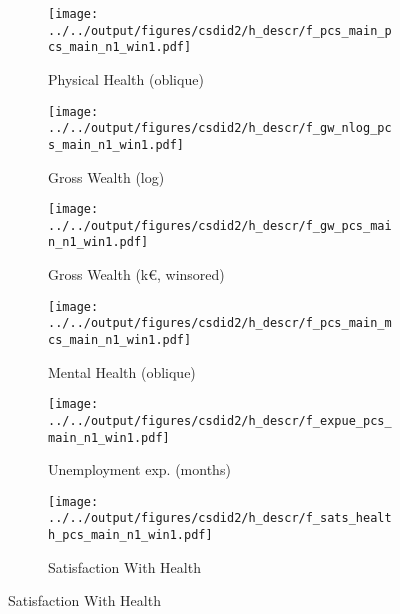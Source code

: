 \begin{figure}[htb!]
    \centering \setcounter{subfigure}{0}%
    \begin{subfigure}{0.32\textwidth}
        \caption{Physical Health (oblique)}
        \texttt{[image: ../../output/figures/csdid2/h\_descr/f\_pcs\_main\_pcs\_main\_n1\_win1.pdf]}
        \label{sfig:fpcsmainpcsmain}
    \end{subfigure}
    \begin{subfigure}{0.32\textwidth}
        \caption{Gross Wealth (log)}
        \texttt{[image: ../../output/figures/csdid2/h\_descr/f\_gw\_nlog\_pcs\_main\_n1\_win1.pdf]}
        \label{sfig:fgwnlogpcsmain}
    \end{subfigure}
    \begin{subfigure}{0.32\textwidth}
        \caption{Gross Wealth (k€, winsored)}
        \texttt{[image: ../../output/figures/csdid2/h\_descr/f\_gw\_pcs\_main\_n1\_win1.pdf]}
        \label{sfig:fgwpcsmain}
    \end{subfigure}
    \begin{subfigure}{0.32\textwidth}
        \caption{Mental Health (oblique)}
        \texttt{[image: ../../output/figures/csdid2/h\_descr/f\_pcs\_main\_mcs\_main\_n1\_win1.pdf]}
        \label{sfig:fpcsmainmcsmain}
    \end{subfigure}
    \begin{subfigure}{0.32\textwidth}
        \caption{Unemployment exp. (months)}
        \texttt{[image: ../../output/figures/csdid2/h\_descr/f\_expue\_pcs\_main\_n1\_win1.pdf]}
        \label{sfig:fexpuepcsmain}
    \end{subfigure}
    \begin{subfigure}{0.32\textwidth}
        \caption{Satisfaction With Health}
        \texttt{[image: ../../output/figures/csdid2/h\_descr/f\_sats\_health\_pcs\_main\_n1\_win1.pdf]}
        \label{sfig:fsatshealthpcsmain}
    \end{subfigure}

\end{figure}

